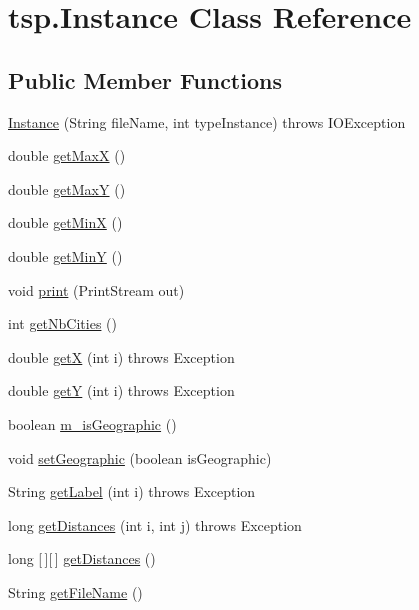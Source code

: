 \hypertarget{classtsp_1_1_instance}{}\section{tsp.\+Instance Class Reference}
\label{classtsp_1_1_instance}
\subsection*{Public Member Functions}
\begin{DoxyCompactItemize}
\item 
\mbox{\hyperlink{classtsp_1_1_instance_ae035e937c11c3832e06cf562f470a21e}{Instance}} (String file\+Name, int type\+Instance)  throws I\+O\+Exception 
\item 
double \mbox{\hyperlink{classtsp_1_1_instance_ace537c157ffb558343c9a38796987dd1}{get\+MaxX}} ()
\item 
double \mbox{\hyperlink{classtsp_1_1_instance_aff99be18538e727e6aa8b9de7c96f781}{get\+MaxY}} ()
\item 
double \mbox{\hyperlink{classtsp_1_1_instance_af3a908c0ce382a0a0dcac8442b4dc45c}{get\+MinX}} ()
\item 
double \mbox{\hyperlink{classtsp_1_1_instance_a2cb9f47796458eb11d04c57ba4aefec6}{get\+MinY}} ()
\item 
void \mbox{\hyperlink{classtsp_1_1_instance_af3fac8f6b1104d6cbfaa15228aaa6e71}{print}} (Print\+Stream out)
\item 
int \mbox{\hyperlink{classtsp_1_1_instance_ad7b27560e9d3b5fff61cfb3056bdb3af}{get\+Nb\+Cities}} ()
\item 
double \mbox{\hyperlink{classtsp_1_1_instance_aaf681fa6bd2c5cca6a7b8ec8baf36800}{getX}} (int i)  throws Exception 
\item 
double \mbox{\hyperlink{classtsp_1_1_instance_aebda0a2b0ded89e41e077f61840e6086}{getY}} (int i)  throws Exception 
\item 
boolean \mbox{\hyperlink{classtsp_1_1_instance_a38f72c0ba953f2a70571d47233b62c69}{m\+\_\+is\+Geographic}} ()
\item 
void \mbox{\hyperlink{classtsp_1_1_instance_a72144d15fab405a9069aa9af271959e1}{set\+Geographic}} (boolean is\+Geographic)
\item 
String \mbox{\hyperlink{classtsp_1_1_instance_a71339bdd0942060e28b4fb4e601cf504}{get\+Label}} (int i)  throws Exception 
\item 
long \mbox{\hyperlink{classtsp_1_1_instance_a571eec5c3eea92d13a0ec59f2d983c6f}{get\+Distances}} (int i, int j)  throws Exception 
\item 
long \mbox{[}$\,$\mbox{]}\mbox{[}$\,$\mbox{]} \mbox{\hyperlink{classtsp_1_1_instance_aea035555dcc3a08ab00b87757eb5c128}{get\+Distances}} ()
\item 
String \mbox{\hyperlink{classtsp_1_1_instance_a26abbb00653df23df3f0d360cd3fa3ff}{get\+File\+Name}} ()
\end{DoxyCompactItemize}



